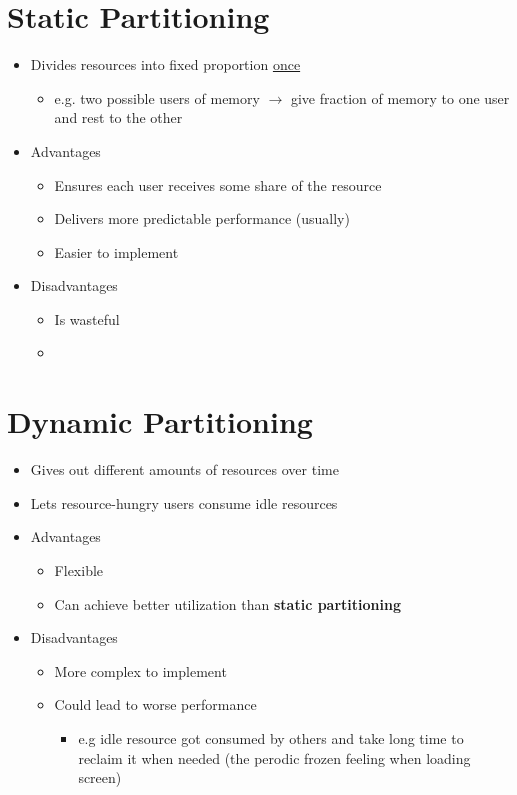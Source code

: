 \documentclass[12pt]{article}
\begin{document}
\section{Static Partitioning}

\begin{itemize}
    \item Divides resources into fixed proportion \underline{once}
    \begin{itemize}
        \item e.g. two possible users of memory $\to$ give fraction of memory to one user and
        rest to the other
    \end{itemize}
    \item Advantages
    \begin{itemize}
        \item Ensures each user receives some share of the resource
        \item Delivers more predictable performance (usually)
        \item Easier to implement
    \end{itemize}
    \item Disadvantages
    \begin{itemize}
        \item Is wasteful
        \item
    \end{itemize}
\end{itemize}


\section{Dynamic Partitioning}

\begin{itemize}
    \item Gives out different amounts of resources over time
    \item Lets resource-hungry users consume idle resources
    \item Advantages
    \begin{itemize}
        \item Flexible
        \item Can achieve better utilization than \textbf{static partitioning}
    \end{itemize}
    \item Disadvantages
    \begin{itemize}
        \item More complex to implement
        \item Could lead to worse performance
        \begin{itemize}
            \item e.g idle resource got consumed by others and take long
            time to reclaim it when needed (the perodic frozen feeling when loading screen)
        \end{itemize}
    \end{itemize}
\end{itemize}
\end{document}
